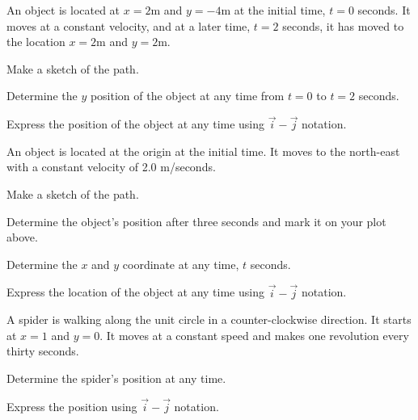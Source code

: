 \begin{problem}
\item An object is located at $x=2$m and $y=-4$m at the initial time,
  $t=0$ seconds. It moves at a constant velocity, and at a later time,
  $t=2$ seconds, it has moved to the location $x=2$m and $y=2$m.
  \begin{subproblem}
  \item Make a sketch of the path.
    \vfill
  \item Determine the $y$ position of the object at any time from
    $t=0$ to $t=2$ seconds.
    \vfill
  \item Express the position of the object at any time using
    $\vec{i}-\vec{j}$ notation.
    \vspace{3em}
  \end{subproblem}

  \clearpage

\item An object is located at the origin at the initial time. It moves
  to the north-east with a constant velocity of 2.0 m/seconds. 

  \begin{subproblem}
  \item Make a sketch of the path.
    \vfill
  \item Determine the object's position after three seconds and mark
    it on your plot above.
    \vspace{4em}
  \item Determine the $x$ and $y$ coordinate at any time, $t$ seconds.
    \vfill
  \item Express the location of the object at any time using
    $\vec{i}-\vec{j}$ notation.
    \vspace{3em}
  \end{subproblem}

  \clearpage

\item A spider is walking along the unit circle in a counter-clockwise
  direction. It starts at $x=1$ and $y=0$. It moves at a constant
  speed and makes one revolution every thirty seconds.

  \scalebox{0.35}{}

  \begin{subproblem}
  \item Determine the spider's position at any time.
    \vfill
  \item Express the position using $\vec{i}-\vec{j}$ notation.
    \vspace{5em}
  \end{subproblem}

\end{problem}

